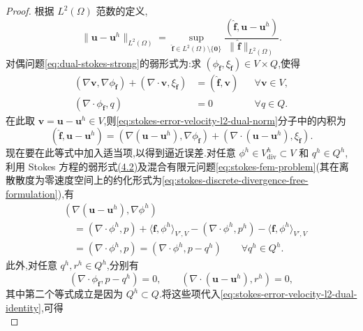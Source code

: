 \begin{proof}
根据 $L^2(\Omega)$ 范数的定义,
\begin{equation}\label{eq:stokes-error-velocity-l2-dual-norm}
  \|\bm{u}-\bm{u}^h\|_{L^2(\Omega)}
  =\sup_{\widehat{\bm{f}}\in L^2(\Omega)\setminus\{\bm{0}\}}
    \frac{(\widehat{\bm{f}},\bm{u}-\bm{u}^h)}
         {\|\widehat{\bm{f}}\|_{L^2(\Omega)}}.
\end{equation}
对偶问题\cref{eq:dual-stokes-strong}的弱形式为:求 $(\phi_{\widehat{\bm{f}}},\xi_{\widehat{\bm{f}}})\in V\times Q$,使得
\[
\begin{aligned}
  (\nabla\bm{v},\nabla\phi_{\widehat{\bm{f}}})
   +(\nabla\cdot\bm{v},\xi_{\widehat{\bm{f}}})
    &=(\widehat{\bm{f}},\bm{v})
      &&\forall\bm{v}\in V,\\
  (\nabla\cdot\phi_{\widehat{\bm{f}}},q)
    &=0 &&\forall q\in Q.
\end{aligned}
\]
在此取 $\bm{v}=\bm{u}-\bm{u}^h\in V$,则\cref{eq:stokes-error-velocity-l2-dual-norm}分子中的内积为
\begin{equation}\label{eq:stokes-error-velocity-l2-dual-identity}
  (\widehat{\bm{f}},\bm{u}-\bm{u}^h)
  =(\nabla(\bm{u}-\bm{u}^h),
     \nabla\phi_{\widehat{\bm{f}}})
   +(\nabla\cdot(\bm{u}-\bm{u}^h),
     \xi_{\widehat{\bm{f}}}).
\end{equation}
现在要在此等式中加入适当项,以得到逼近误差.对任意 $\phi^h\in V_{\mathrm{div}}^h\subset V$ 和 $q^h\in Q^h$,利用 Stokes 方程的弱形式\hyperref[eq:stokes-weak]{(4.2)}及混合有限元问题\cref{eq:stokes-fem-problem}(其在离散散度为零速度空间上的约化形式为\cref{eq:stokes-discrete-divergence-free-formulation}),有
\begin{equation}\label{eq:stokes-error-velocity-l2-discrete-identity}
\begin{aligned}
  &(\nabla(\bm{u}-\bm{u}^h),\nabla\phi^h)\\
  &\quad=(\nabla\cdot\phi^h,p)
      +\langle\bm{f},\phi^h\rangle_{V',V}
      -(\nabla\cdot\phi^h,p^h)
      -\langle\bm{f},\phi^h\rangle_{V',V}\\
  &\quad=(\nabla\cdot\phi^h,p)
       =(\nabla\cdot\phi^h,p-q^h)
       \qquad\forall q^h\in Q^h.
\end{aligned}
\end{equation}
此外,对任意 $q^h,r^h\in Q^h$,分别有
\[
  (\nabla\cdot\phi_{\widehat{\bm{f}}},p-q^h)=0,
  \qquad
  (\nabla\cdot(\bm{u}-\bm{u}^h),r^h)=0,
\]
其中第二个等式成立是因为 $Q^h\subset Q$.将这些项代入\cref{eq:stokes-error-velocity-l2-dual-identity},可得
\begin{equation}\label{eq:stokes-error-velocity-l2-approximation-identity}

\end{equation}
\end{proof}
